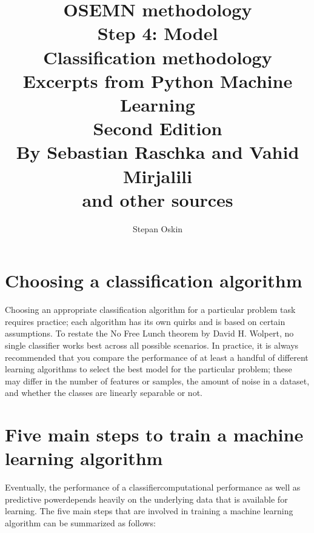 \documentclass[11pt]{article}
\begin{document}
    \title{OSEMN methodology \\
    Step 4: Model \\
    Classification methodology \\
    Excerpts from Python Machine Learning \\
    Second Edition \\
    By Sebastian Raschka and Vahid Mirjalili\cite{RaschkaMirjalili2017} \\
    and other sources}

    \author{Stepan Oskin}

    \maketitle

    \begin{abstract}

    \end{abstract}

    \section{Choosing a classification algorithm} \label{sec:choosing_classification_algorithm}

    Choosing an appropriate classification algorithm for a particular problem task requires practice;
    each algorithm has its own quirks and is based on certain assumptions.
    To restate the No Free Lunch theorem by David H. Wolpert\cite{Wolpert1996}, no single classifier works best across all possible scenarios.
    In practice, it is always recommended that you compare the performance of at least a handful of different learning algorithms to select the best model for the particular problem;
    these may differ in the number of features or samples, the amount of noise in a dataset, and whether the classes are linearly separable or not.

    \section{Five main steps to train a machine learning algorithm} \label{sec:five_steps_to_train_algorithm}

    Eventually, the performance of a classifier\textemdash computational performance as well as predictive power\textemdash depends heavily on the underlying data that is available for learning.
    The five main steps that are involved in training a machine learning algorithm can be summarized as follows:
\end{document}

